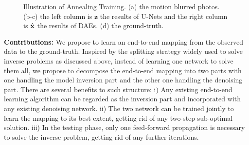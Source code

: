 \documentclass[10pt,twocolumn,letterpaper]{article}
\begin{document}
\begin{figure}[t]
\centering 
{}
\caption{Illustration of Annealing Training. (a) the motion blurred photos. (b-c) the left column is $\mathbf{z}$ the results of U-Nets and the right column is $\hat{{\mathbf{x}}}$ the results of DAEs. (d) the ground-truth.}
\label{fig:intro}
\end{figure}


{\bf{Contributions:}}
We propose to learn an end-to-end mapping from the observed data to the ground-truth. 
Inspired by the splitting strategy widely used to solve inverse problems as discussed above, instead of learning one network to solve them all, we propose to decompose the end-to-end mapping into two parts with one handling the model inversion part and the other one handling the denoising part. There are several benefits to such structure:
i) Any existing end-to-end learning algorithm can be regarded as the inversion part and incorporated with any existing denoising network. 
ii) The two network can be trained jointly to learn the mapping to its best extent, getting rid of any two-step sub-optimal solution.
iii) In the testing phase, only one feed-forward propagation is necessary to solve the inverse problem, getting rid of any further iterations.
\end{document}
